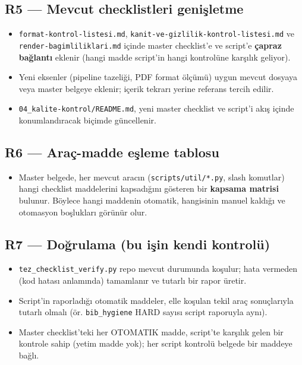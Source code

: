 \documentclass[
  turkish,
  12pt,
  a4paper,
]{report}
\providecommand{\tightlist}{%
  \setlength{\itemsep}{0pt}\setlength{\parskip}{0pt}}
\begin{document}
\subsection{R5 --- Mevcut checklistleri
genişletme}\label{r5-mevcut-checklistleri-geniux15fletme}

\begin{itemize}
\tightlist
\item
  \texttt{format-kontrol-listesi.md},
  \texttt{kanit-ve-gizlilik-kontrol-listesi.md} ve
  \texttt{render-bagimliliklari.md} içinde master checklist'e ve
  script'e \textbf{çapraz bağlantı} eklenir (hangi madde script'in hangi
  kontrolüne karşılık geliyor).
\item
  Yeni eksenler (pipeline tazeliği, PDF format ölçümü) uygun mevcut
  dosyaya veya master belgeye eklenir; içerik tekrarı yerine referans
  tercih edilir.
\item
  \texttt{04\_kalite-kontrol/README.md}, yeni master checklist ve
  script'i akış içinde konumlandıracak biçimde güncellenir.
\end{itemize}

\subsection{R6 --- Araç-madde eşleme
tablosu}\label{r6-arauxe7-madde-eux15fleme-tablosu}

\begin{itemize}
\tightlist
\item
  Master belgede, her mevcut aracın (\texttt{scripts/util/*.py}, slash
  komutlar) hangi checklist maddelerini kapsadığını gösteren bir
  \textbf{kapsama matrisi} bulunur. Böylece hangi maddenin otomatik,
  hangisinin manuel kaldığı ve otomasyon boşlukları görünür olur.
\end{itemize}

\subsection{R7 --- Doğrulama (bu işin kendi
kontrolü)}\label{r7-doux11frulama-bu-iux15fin-kendi-kontroluxfc}

\begin{itemize}
\tightlist
\item
  \texttt{tez\_checklist\_verify.py} repo mevcut durumunda koşulur; hata
  vermeden (kod hatası anlamında) tamamlanır ve tutarlı bir rapor
  üretir.
\item
  Script'in raporladığı otomatik maddeler, elle koşulan tekil araç
  sonuçlarıyla tutarlı olmalı (ör. \texttt{bib\_hygiene} HARD sayısı
  script raporuyla aynı).
\item
  Master checklist'teki her OTOMATIK madde, script'te karşılık gelen bir
  kontrole sahip (yetim madde yok); her script kontrolü belgede bir
  maddeye bağlı.
\end{itemize}
\end{document}
